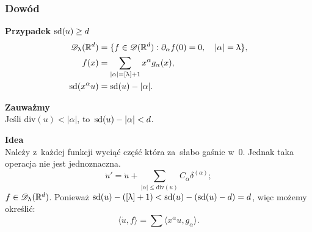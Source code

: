 \documentclass[10pt,t]{beamer}
\newcommand{\divDegree}{\textrm{div}}
\begin{document}
\begin{frame}
  \frametitle{Dowód}


  \textbf{Przypadek} $\textrm{sd}( u ) \geq d$ \\
  \begin{subequations}
    \begin{align}
      \label{eq:Epstein-Glaser-08-A}
      \mathcal{D}_{ \uplambda }( \mathbb{R}^{ d } )
      &= \{ f \in \mathcal{D}( \mathbb{R}^{ d } ) : \partial_{ \alpha } f( 0 ) = 0, \quad | \alpha | = \uplambda \}, \\
      \label{eq:EpsteinGlaser-08-B}
      f( x ) &= \sum_{ | \alpha | = [ \uplambda ] + 1 } x^{ \alpha } g_{ \alpha }( x ), \\
      \label{eq:EpsteinGlaser-08-C}
      \textrm{sd}( x^{ \alpha } u ) &= \textrm{sd}( u ) - | \alpha |.
    \end{align}
  \end{subequations}

  \textbf{Zauważmy} \\
  Jeśli $\divDegree( u ) < | \alpha |$, to~$\textrm{sd}( u ) - | \alpha | < d$.

  \vspace{\spaceFour}



  \textbf{Idea} \\
  Należy z~każdej funkcji wyciąć część która za~słabo gaśnie w~0.
  Jednak taka operacja nie jest jednoznaczna.
  \begin{equation}
    \label{eq:Epstein-Glaser-09}
    \dot{ u }' = \dot{ u } + \sum\limits_{ | \alpha | \leq \textrm{div}( u ) }
    C_{ \alpha } \delta^{ ( \alpha ) };
  \end{equation}
  $f \in \mathcal{D}_{ \uplambda }( \mathbb{R}^{ d } )$. Ponieważ
  $\textrm{sd}( u ) - ( [ \uplambda ] + 1 ) < \textrm{sd}( u ) - ( \textrm{sd}( u ) - d ) = d$,
  więc możemy określić:
  \begin{equation}
    \label{eq:Epstein-Glaser-10}
    \langle \dot{ u }, f \rangle = \sum \langle x^{ \alpha } u, g_{ \alpha } \rangle.
  \end{equation}

\end{frame}
\end{document}
